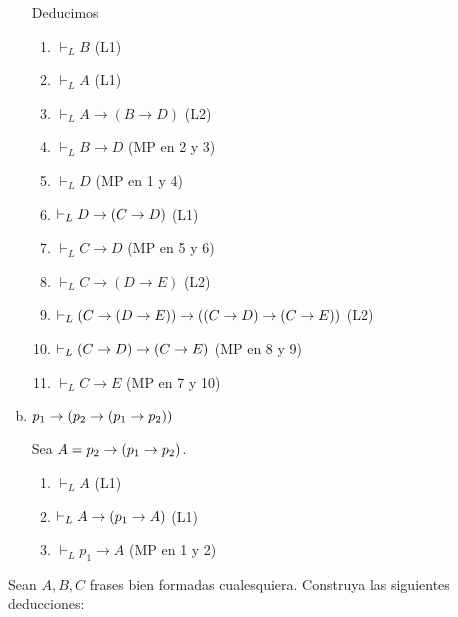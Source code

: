 \begin{enumerate}[(a)]
\begin{solution}
    Deducimos
    \begin{enumerate}[1.]
        \item $\vdash_L B$               \hfill (L1)
        \item $\vdash_L A$               \hfill (L1)
        \item $\vdash_L A \to (B \to D)$ \hfill (L2)
        \item $\vdash_L        B \to D$  \hfill (MP en 2 y 3)
        \item $\vdash_L D$               \hfill (MP en 1 y 4)
        \item $\vdash_L D \to (C \to D)$          \hfill (L1)
        \item $\vdash_L C \to D$         \hfill (MP en 5 y 6)
        \item $\vdash_L C \to (D \to E)$ \hfill (L2)
        \item $\vdash_L (C \to (D \to E)) \to ((C \to D) \to (C \to E))$        \hfill (L2)
        \item $\vdash_L (C \to D) \to (C \to E)$        \hfill (MP en 8 y 9)
        \item $\vdash_L C \to E$         \hfill (MP en 7 y 10)
    \end{enumerate}
    \end{solution}
    
    \item $p_1 \to (p_2 \to (p_1 \to p_2))$
    \begin{solution}
    Sea $A = p_2 \to (p_1 \to p_2)$.
    \begin{enumerate}[1.]
        \item $\vdash_L               A$ \hfill (L1)
        \item $\vdash_L A \to (p_1 \to A)$ \hfill (L1)
        \item $\vdash_L     {p_1} \to A$ \hfill (MP en 1 y 2)
    \end{enumerate}
    \end{solution}
\end{enumerate}

\begin{exercise}
Sean $A,B,C$ frases bien formadas cualesquiera. Construya las siguientes deducciones:
\end{exercise}

